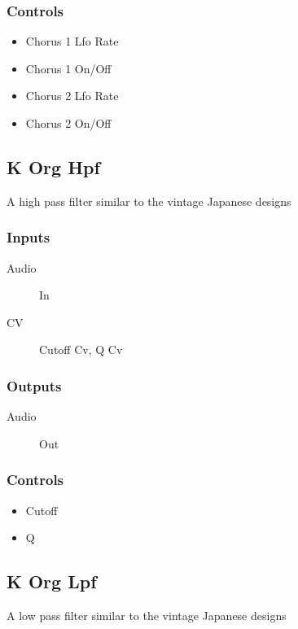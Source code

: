 \subsubsection{Controls}
\begin{itemize}
\item Chorus 1 Lfo Rate
\item Chorus 1 On/Off
\item Chorus 2 Lfo Rate
\item Chorus 2 On/Off
\end{itemize}

\subsection{K Org Hpf}

A high pass filter similar to the vintage Japanese designs



\subsubsection{Inputs}
\begin{description}
\item [Audio] In
\item [CV] Cutoff Cv, Q Cv
\end{description}

\subsubsection{Outputs}
\begin{description}
\item [Audio] Out
\end{description}

\subsubsection{Controls}
\begin{itemize}
\item Cutoff
\item Q
\end{itemize}

\subsection{K Org Lpf}

A low pass filter similar to the vintage Japanese designs




